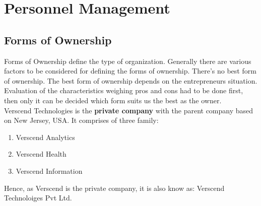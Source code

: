\section{Personnel Management}
\subsection{Forms of Ownership}
Forms of Ownership define the type of organization. Generally there are various factors to be considered for defining the forms of ownership. There's no best form of ownership. The best form of ownership depends on the entrepreneurs situation. Evaluation of the characteristics weighing pros and cons had to be done first, then only it can be decided which form suits us the best as the owner.\\
Verscend Technologies is the \textbf{private company} with the parent company based on New Jersey, USA. It comprises of three family:
\begin{enumerate}
\item Verscend Analytics
\item Verscend Health
\item Verscend Information
\end{enumerate}
Hence, as Verscend is the private company, it is also know as: Verscend Technoloiges Pvt Ltd.
